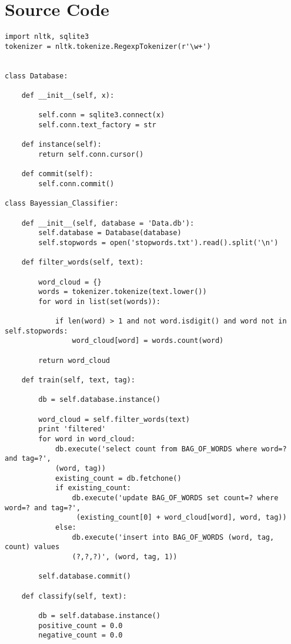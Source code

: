 \documentclass[12pt]{article}
\begin{document}
\section{Source Code}

\begin{verbatim}
import nltk, sqlite3
tokenizer = nltk.tokenize.RegexpTokenizer(r'\w+')


class Database:
    
    def __init__(self, x):
    
        self.conn = sqlite3.connect(x)
        self.conn.text_factory = str
    
    def instance(self):
        return self.conn.cursor()
    
    def commit(self):
        self.conn.commit()

class Bayessian_Classifier:
    
    def __init__(self, database = 'Data.db'):
        self.database = Database(database)
        self.stopwords = open('stopwords.txt').read().split('\n')
    
    def filter_words(self, text):

        word_cloud = {}
        words = tokenizer.tokenize(text.lower())
        for word in list(set(words)):

            if len(word) > 1 and not word.isdigit() and word not in self.stopwords:
                word_cloud[word] = words.count(word)
        
        return word_cloud

    def train(self, text, tag):
        
        db = self.database.instance()
        
        word_cloud = self.filter_words(text)
        print 'filtered'
        for word in word_cloud:
            db.execute('select count from BAG_OF_WORDS where word=? and tag=?', 
            (word, tag))
            existing_count = db.fetchone()
            if existing_count:
                db.execute('update BAG_OF_WORDS set count=? where word=? and tag=?',
                 (existing_count[0] + word_cloud[word], word, tag))
            else:
                db.execute('insert into BAG_OF_WORDS (word, tag, count) values 
                (?,?,?)', (word, tag, 1))
        
        self.database.commit()
    
    def classify(self, text):
    
        db = self.database.instance()
        positive_count = 0.0
        negative_count = 0.0
    

\end{verbatim}
\end{document}
